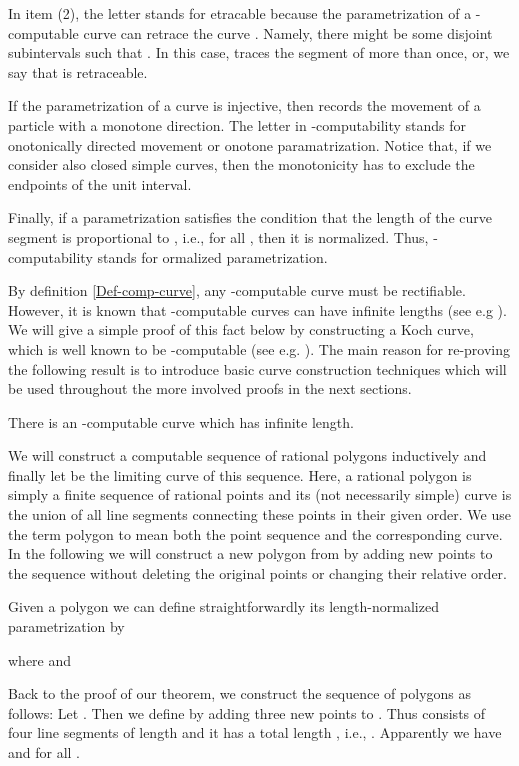 \documentclass{LMCS}
\theoremstyle{plain}
\begin{document}
In item (2), the letter  stands for  etracable because the parametrization  of a -computable curve  can retrace the curve . Namely, there might be some disjoint subintervals  such that . In this case,  traces the segment  of  more than once, or, we say that  is retraceable.

If the parametrization of a curve  is injective, then  records the movement of a particle with a monotone direction. The letter  in -computability stands for onotonically  directed movement or onotone paramatrization. Notice that, if we consider also closed simple curves, then the monotonicity has to exclude the endpoints of the unit interval.

Finally, if a parametrization  satisfies the condition that the length of the curve segment  is proportional to , i.e.,  for all ,  then it is  normalized. Thus, -computability stands for ormalized parametrization.

By definition \ref{Def-comp-curve}, any -computable curve must be rectifiable. However, it is known that -computable curves can have infinite lengths
(see e.g \cite{Ko98}). We will give a simple proof of this fact below by constructing a  Koch curve, which is well known to be -computable (see e.g. \cite{Kam96}). The main reason for re-proving the following result is to introduce basic curve construction techniques which will be used throughout the more involved proofs in the next sections.

\begin{thm}\label{thm-inf-length-M-curve}
There is an -computable curve  which has infinite length.
\end{thm}

\proof
We will construct a computable sequence  of rational polygons inductively and finally let  be the limiting curve of this sequence. Here, a rational polygon is simply a finite sequence  of rational points  and its (not necessarily simple) curve is the union of all line segments connecting these points in their given order. We use the term polygon to mean both the point sequence and the corresponding curve. In the following we will construct a new polygon  from  by adding new points to the sequence  without deleting the original points or changing their relative order.

Given a polygon  we can define straightforwardly its length-normalized parametrization  by


where  and


Back to the proof of our theorem, we construct the sequence  of polygons as follows:
Let . Then we define  by adding three new points  to . Thus  consists of four line segments of length  and it has a total length , i.e., .  Apparently we have  and  for all .
\end{document}
